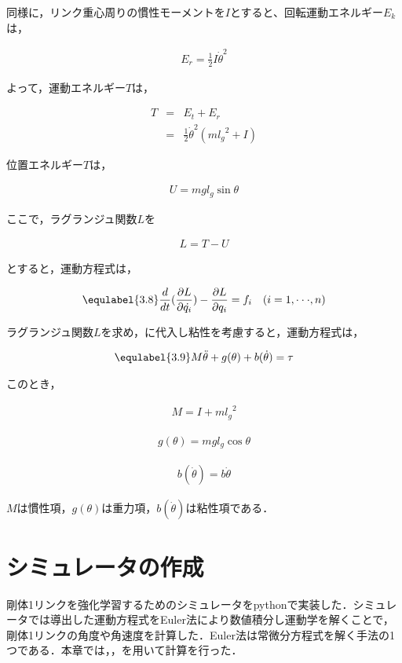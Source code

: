 同様に，リンク重心周りの慣性モーメントを$I$とすると、回転運動エネルギー$E_{k}$は，

\begin{eqnarray}
  E_{r} 
  =\frac{1}{2}I{\dot{\theta}}^2
\end{eqnarray}

よって，運動エネルギー$T$は，

\begin{eqnarray}
  T
  &=&E_{t} + E_{r} \nonumber \\
  &=&\frac{1}{2}{\dot{\theta}}^2(m{l_{g}}^2 + I)
\end{eqnarray}

位置エネルギー$T$は，

\begin{eqnarray}
  U
  = mgl_{g}\sin\theta
\end{eqnarray}

ここで，ラグランジュ関数$L$を

\begin{eqnarray}
  L
  =T - U
\end{eqnarray}

とすると，運動方程式は，

\begin{eqnarray}
  \equlabel{3.8}
  \frac{d}{dt}(\frac{\partial L}{\partial \dot{q_{i}}}) - \frac{\partial L}{\partial q_{i}} = f_{i} \quad (i = 1,\cdot\cdot\cdot, n)
\end{eqnarray}

ラグランジュ関数$L$を求め，に代入し粘性を考慮すると，運動方程式は，

\begin{eqnarray}
  \equlabel{3.9}
  M\ddot{\theta} + g(\theta) + b(\dot{\theta}) = \tau
\end{eqnarray}

このとき，

\begin{eqnarray}
  M = I + m{l_{g}}^2
\end{eqnarray}

\begin{eqnarray}
  g(\theta) = mgl_{g}\cos\theta
\end{eqnarray}

\begin{eqnarray}
  b(\dot{\theta}) = b\dot{\theta}
\end{eqnarray}

$M$は慣性項，$g(\theta)$は重力項，$b(\dot{\theta})$は粘性項である．

\section{シミュレータの作成}
剛体1リンクを強化学習するためのシミュレータをpythonで実装した．シミュレータでは導出した運動方程式をEuler法\cite{euler}により数値積分し運動学を解くことで，剛体1リンクの角度や角速度を計算した．Euler法は常微分方程式を解く手法の1つである．本章では，，を用いて計算を行った．\\

